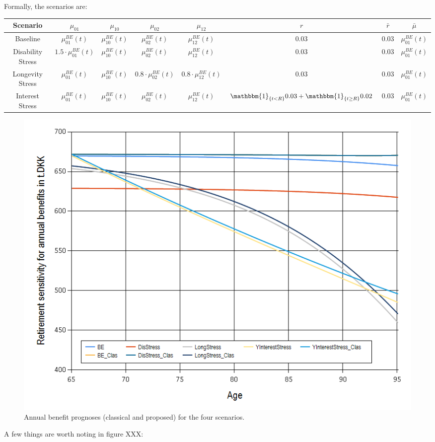 \documentclass{book}
\newcommand{\1}[1]{\mathbbm{1}_{\left\lbrace #1 \right\rbrace}}
\theoremstyle{break}
\theoremstyle{remark}
\numberwithin{equation}{section}
\begin{document}
Formally, the scenarios are:

\begin{center}
	\begin{tabular}{ |c|c|c|c|c|c|c|c| }
		\hline
		Scenario & $\mu_{01}$ & $\mu_{10}$ & $\mu_{02}$ & $\mu_{12}$ & $r$ & $\bar{r}$ & $\bar{\mu}$ \\
		\hline
		Baseline & $\mu_{01}^{BE}(t)$ & $\mu_{10}^{BE}(t)$ & $\mu_{02}^{BE}(t)$ &$\mu_{12}^{BE}(t)$ & 0.03 & 0.03 & $\mu_{01}^{BE}(t)$ \\
		Disability Stress & $1.5 \cdot \mu_{01}^{BE}(t)$ & $\mu_{10}^{BE}(t)$ & $\mu_{02}^{BE}(t)$ & $\mu_{12}^{BE}(t)$ & 0.03 & 0.03 & $\mu_{01}^{BE}(t)$ \\
		Longevity Stress & $\mu_{01}^{BE}(t)$ & $\mu_{10}^{BE}(t)$ & $0.8 \cdot \mu_{02}^{BE}(t)$ & $0.8 \cdot \mu_{12}^{BE}(t)$ & 0.03 & 0.03 & $\mu_{01}^{BE}(t)$ \\
		Interest Stress & $\mu_{01}^{BE}(t)$ & $\mu_{10}^{BE}(t)$ & $\mu_{02}^{BE}(t)$ & $\mu_{12}^{BE}(t)$ & $\1{t < R} 0.03 + \1{t \geq R} 0.02$ & 0.03 & $\mu_{01}^{BE}(t)$ \\
		\hline
	\end{tabular}
\end{center}

\begin{figure}[H]
	\centering
	\caption{Annual benefit prognoses (classical and proposed) for the four scenarios.}
	\includegraphics[width=\textwidth]{Benefits}
\end{figure}

A few things are worth noting in figure XXX:
\end{document}
